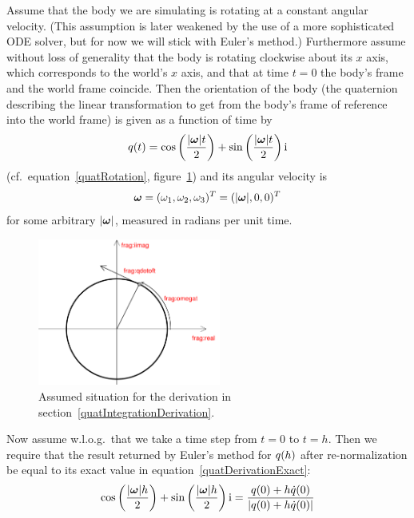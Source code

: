 Assume that the body we are simulating is rotating at a constant angular velocity.
(This assumption is later weakened by the use of a more sophisticated ODE solver,
but for now we will stick with Euler's method.) Furthermore assume without loss of
generality that the body is rotating clockwise about its $x$ axis, which corresponds
to the world's $x$ axis, and that at time $t=0$ the body's frame and the world frame
coincide. Then the orientation of the body (the quaternion describing
the linear transformation to get from the body's frame of reference into the world
frame) is given as a function of time by
\begin{equation}
\label{quatDerivationExact}
\q{q}(t) = \cos\left(\frac{\norm{\ve{\omega}}t}{2}\right) +
    \sin\left(\frac{\norm{\ve{\omega}}t}{2}\right)\qi
\end{equation}
(cf.\ equation~\ref{quatRotation}, figure~\ref{quatIntFig1}) and its angular velocity is
\begin{equation}
\ve{\omega} = (\omega_1, \omega_2, \omega_3)^T = (\norm{\ve{\omega}}, 0, 0)^T
\end{equation}
for some arbitrary $\norm{\ve{\omega}}$, measured in radians per unit time.

\begin{figure}
\centerline{\includegraphics[width=6cm]{figures/quaternion2}}
\caption{Assumed situation for the derivation in
section~\ref{quatIntegrationDerivation}.\label{quatIntFig1}}
\end{figure}

Now assume w.l.o.g.\ that we take a time step from $t = 0$ to $t = h$.
Then we require that the result returned by Euler's method for $q(h)$
after re-normalization be equal to its exact value in equation~\ref{quatDerivationExact}:
\begin{equation}
\label{quatDerivationSetup}
\cos\left(\frac{\norm{\ve{\omega}} h}{2}\right) +
    \sin\left(\frac{\norm{\ve{\omega}} h}{2}\right)\qi =
    \frac{\q{q}(0) + h \dot{\q{q}}(0)}
        {\norm{\q{q}(0) + h \dot{\q{q}}(0)}}
\end{equation}

